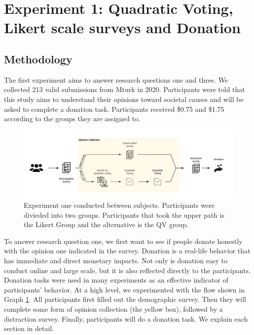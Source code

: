 \section{Experiment 1: Quadratic Voting, Likert scale surveys and Donation}
\subsection{Methodology} \label{method-1}
The first experiment aims to answer research questions one and three. 
We collected 213 valid submissions from Mturk in 2020. %
Participants were told that this study aims to understand their opinions toward societal causes and will be asked to complete a donation task.
Participants received \$0.75 and \$1.75 according to the groups they are assigned to.

\begin{figure}[htpb]
    \centering
    \includegraphics[width=\textwidth, keepaspectratio=true]{content/image/exp1_flow.png}
    \caption{
        Experiment one conducted between subjects. Participants were divieded into two groups. Participants that took the upper path is the Likert Group and the alternative is the QV group.
    }
    \label{fig:exp1_image_flow}
\end{figure}

To answer research question one, we first want to see if people donate honestly with the opinion one indicated in the survey.
Donation is a real-life behavior that has immediate and direct monetary impacts.
Not only is donation easy to conduct online and large scale, but it is also reflected directly to the participants.
Donation tasks were used in many experiments \cite{Xiao2019, benz2008people, gendall2010effect} as an effective indicator of participants' behavior.
At a high level, we experimented with the flow shown in Graph \ref{fig:exp1_image_flow}.
All participants first filled out the demographic survey.
Then they will complete some form of opinion collection (the yellow box), followed by a distraction survey.
Finally, participants will do a donation task.
We explain each section in detail.

